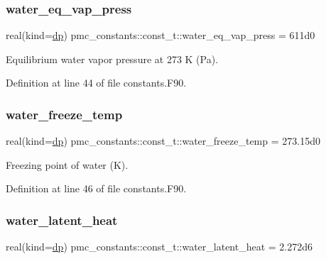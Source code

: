 \subsubsection{\texorpdfstring{water\+\_\+eq\+\_\+vap\+\_\+press}{water\_eq\_vap\_press}}
{\footnotesize\ttfamily real(kind=\mbox{\hyperlink{namespacepmc__constants_a396b7709ed4da67dac74cb46a1466ed6}{dp}}) pmc\+\_\+constants\+::const\+\_\+t\+::water\+\_\+eq\+\_\+vap\+\_\+press = 611d0}



Equilibrium water vapor pressure at 273 K (Pa). 



Definition at line 44 of file constants.\+F90.

\mbox{\label{structpmc__constants_1_1const__t_aab10bb281fe8ee00e1189fc26c83a949}} 
\subsubsection{\texorpdfstring{water\+\_\+freeze\+\_\+temp}{water\_freeze\_temp}}
{\footnotesize\ttfamily real(kind=\mbox{\hyperlink{namespacepmc__constants_a396b7709ed4da67dac74cb46a1466ed6}{dp}}) pmc\+\_\+constants\+::const\+\_\+t\+::water\+\_\+freeze\+\_\+temp = 273.\+15d0}



Freezing point of water (K). 



Definition at line 46 of file constants.\+F90.

\mbox{\label{structpmc__constants_1_1const__t_adb863b197294a8477f25ebebba108f60}} 
\subsubsection{\texorpdfstring{water\+\_\+latent\+\_\+heat}{water\_latent\_heat}}
{\footnotesize\ttfamily real(kind=\mbox{\hyperlink{namespacepmc__constants_a396b7709ed4da67dac74cb46a1466ed6}{dp}}) pmc\+\_\+constants\+::const\+\_\+t\+::water\+\_\+latent\+\_\+heat = 2.\+272d6}



